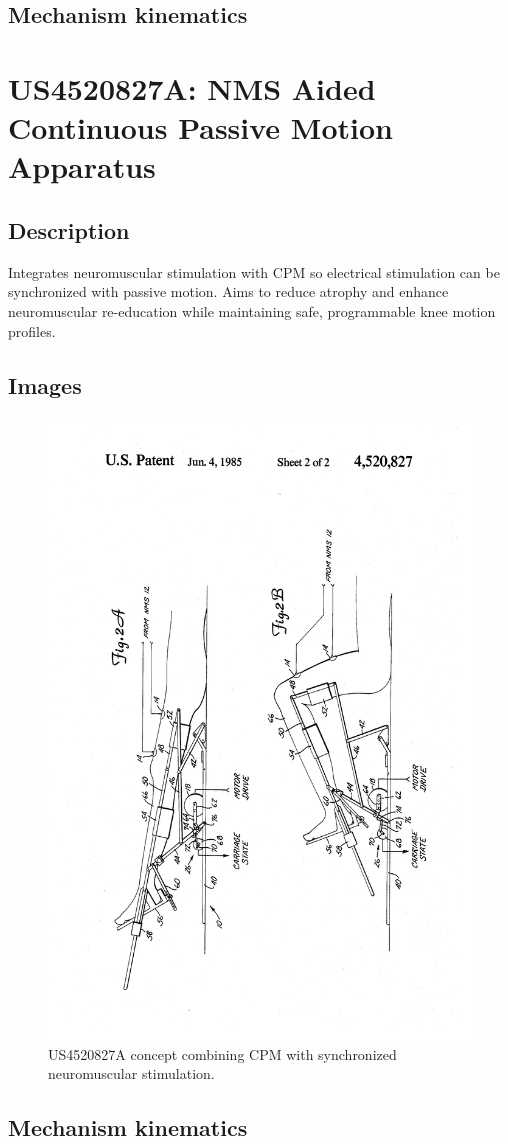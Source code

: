 \documentclass[11pt]{article}
\begin{document}
\subsection{Mechanism kinematics}

\section{US4520827A: NMS Aided Continuous Passive Motion Apparatus}
\subsection{Description}
Integrates neuromuscular stimulation with CPM so electrical stimulation can be synchronized with passive motion. Aims to reduce atrophy and enhance neuromuscular re-education while maintaining safe, programmable knee motion profiles.
\subsection{Images}
\begin{figure}[H]
  \centering
  \includegraphics[width=0.54\linewidth, angle=-90]{US4520827.png}
  \caption{US4520827A concept combining CPM with synchronized neuromuscular stimulation.}
  \label{fig:US4520827A}
\end{figure}

\subsection{Mechanism kinematics}
\end{document}

